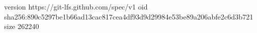 version https://git-lfs.github.com/spec/v1
oid sha256:890c5297be1b66ad13cac817cea4df93d9d29984e53be89a206abfe2c6d3b721
size 262240
